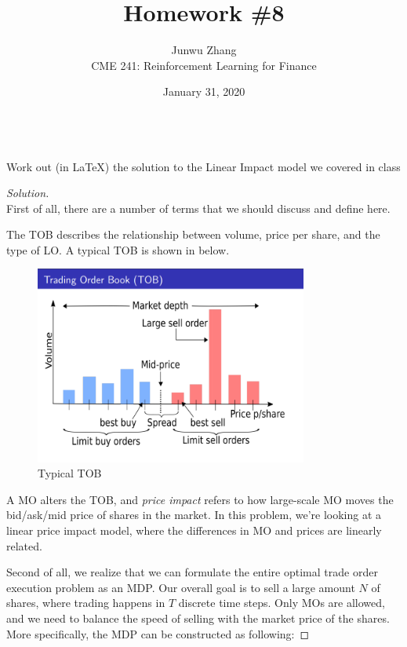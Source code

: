 \documentclass[12pt]{article}
\date{January 31, 2020}
\newenvironment{problem}[2][Problem]{\begin{trivlist}
\item[\hskip \labelsep {\bfseries #1}\hskip \labelsep {\bfseries #2.}]}{\end{trivlist}}
\newenvironment{solution}
  {\renewcommand\qedsymbol{$\blacksquare$}\begin{proof}[Solution]}
  {\end{proof}}
\begin{document}
 
\title{Homework \#8}
\author{Junwu Zhang\\ 
CME 241: Reinforcement Learning for Finance \\}
\maketitle

\begin{problem}{1}
\text{ }\\
Work out (in LaTeX) the solution to the Linear Impact model we covered in class
\end{problem}
\begin{solution}
\text{ }\\
First of all, there are a number of terms that we should discuss and define here. 

The \gls{TOB} describes the relationship between volume, price per share, and the type of \gls{LO}. A typical \gls{TOB} is shown in  below.

\begin{figure}[H]
\centering
\includegraphics[width=0.8\textwidth]{TOB}
\caption{Typical \acrfull{TOB}}
\label{fig:TOB}
\end{figure}

A \gls{MO} alters the \gls{TOB}, and \textit{price impact} refers to how large-scale \gls{MO} moves the bid/ask/mid price of shares in the market. In this problem, we're looking at a linear price impact model, where the differences in \gls{MO} and prices are linearly related.

Second of all, we realize that we can formulate the entire optimal trade order execution problem as an \gls{MDP}. Our overall goal is to sell a large amount $N$ of shares, where trading happens in $T$ discrete time steps. Only \gls{MO}s are allowed, and we need to balance the speed of selling with the market price of the shares. More specifically, the \gls{MDP} can be constructed as following:


\end{solution}
\end{document}
